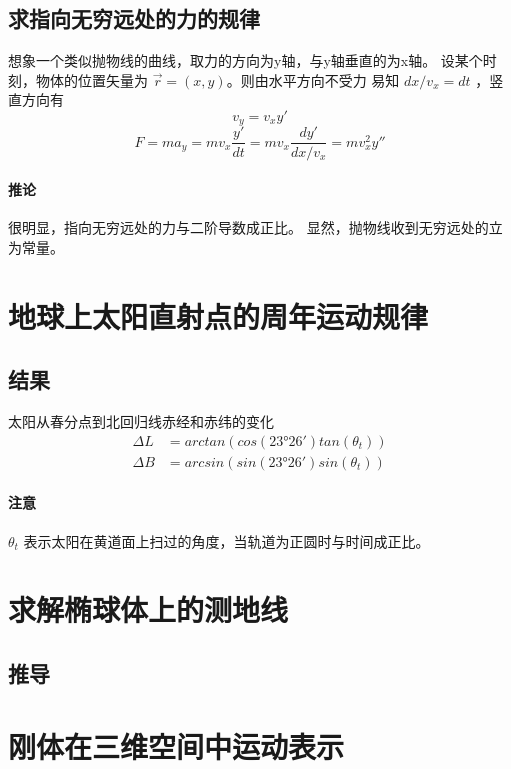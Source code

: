 \documentclass{ctexart}
\begin{document}
	\subsection{求指向无穷远处的力的规律}
	想象一个类似抛物线的曲线，取力的方向为y轴，与y轴垂直的为x轴。
	设某个时刻，物体的位置矢量为 $ \vec{r} =(x,y) $。则由水平方向不受力
	易知 $dx / v_x = dt$ ，竖直方向有
	\begin{equation}
	v_y = v_x y'
	\end{equation}
	\begin{equation}
	F = m a_y = m v_x \frac{y'}{dt} = m v_x \frac{dy'}{dx / v_x} = m v_x^2 y''
	\end{equation}
	\paragraph{推论}
	很明显，指向无穷远处的力与二阶导数成正比。
	显然，抛物线收到无穷远处的立为常量。
	
	
	
	\section{地球上太阳直射点的周年运动规律}
	\subsection{结果}
	太阳从春分点到北回归线赤经和赤纬的变化
	\begin{equation}
	\begin{split}
	\varDelta L &= arctan(cos(23°26') tan(\theta_t)) \\
	\varDelta B &= arcsin(sin(23°26') sin(\theta_t))
	\end{split}
	\end{equation}
	\paragraph{注意}
	$ \theta_t $ 表示太阳在黄道面上扫过的角度，当轨道为正圆时与时间成正比。
	
	
	\section{求解椭球体上的测地线}
	\subsection{推导}
	
	
	\section{刚体在三维空间中运动表示}
\end{document}
